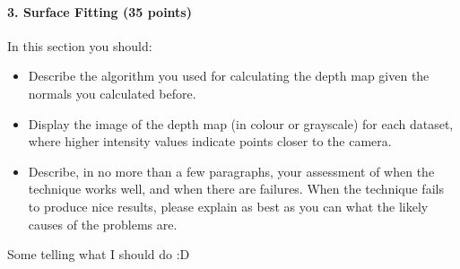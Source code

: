 \documentclass{paper}
\begin{document}
\paragraph{3. Surface Fitting (35 points)}

In this section you should:

\begin{itemize}
\item Describe the algorithm you used for calculating the depth map given the normals you calculated before.
\item Display the image of the depth map (in colour or grayscale) for each dataset, where higher intensity values indicate points closer to the camera.
\item Describe, in no more than a few paragraphs, your assessment of when the technique works well, and when there are failures. When the technique fails to produce nice results, please explain as best as you can what the likely causes of the problems are.
\end{itemize}

Some telling what I should do :D




 
\end{document}
